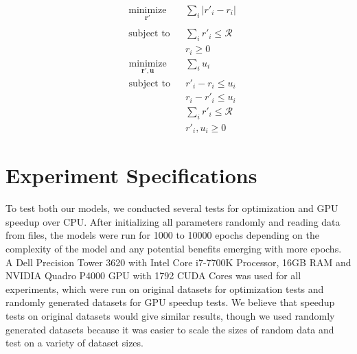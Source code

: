 \documentclass[12pt]{article}
\newcommand{\vect}[1]{\mathbf{#1}}  %
\begin{document}
    \begin{multicols}{2}
        \begin{equation} \label{eq:lp_math_constrain_rewards}
        \begin{aligned}
            & \underset{\vect{r'}}{\text{minimize}}
            & & \sum_{i}|r'_i - r_i|\\ \\
            & \text{subject to}
            & & \sum_{i}r'_i \leq \mathcal{R}\\
            &&& r_i \geq 0
        \end{aligned}
        \end{equation}\break
        \begin{equation} \label{eq:lp_code_constrain_rewards}
        \begin{aligned}
            & \underset{\vect{r'}, \vect{u}}{\text{minimize}}
            & & \sum_{i} u_i\\
            & \text{subject to}
            & & r'_i - r_i \leq u_i\\
            &&& r_i - r'_i \leq u_i\\
            &&& \sum_{i} r'_i \leq \mathcal{R}\\
            &&& r'_i, u_i \geq 0
        \end{aligned}
        \end{equation}
    \end{multicols}

    \section{Experiment Specifications} \label{sec:Experiment Specifications}
    To test both our models, we conducted several tests for optimization and GPU speedup over CPU. After initializing all parameters randomly and reading data from files, the models were run for 1000 to 10000 epochs depending on the complexity of the model and any potential benefits emerging with more epochs. \\
    
    A Dell Precision Tower 3620 with Intel Core i7-7700K Processor, 16GB RAM and NVIDIA Quadro P4000 GPU with 1792 CUDA Cores was used for all experiments, which were run on original datasets for optimization tests and randomly generated datasets for GPU speedup tests. We believe that speedup tests on original datasets would give similar results, though we used randomly generated datasets because it was easier to scale the sizes of random data and test on a variety of dataset sizes.\\
    
\end{document}
